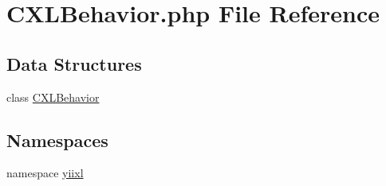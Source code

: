 \hypertarget{CXLBehavior_8php}{
\section{CXLBehavior.php File Reference}
\label{CXLBehavior_8php}
}
\subsection*{Data Structures}
\begin{DoxyCompactItemize}
\item 
class \hyperlink{classCXLBehavior}{CXLBehavior}
\end{DoxyCompactItemize}
\subsection*{Namespaces}
\begin{DoxyCompactItemize}
\item 
namespace \hyperlink{namespaceyiixl}{yiixl}
\end{DoxyCompactItemize}

